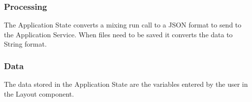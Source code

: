 \subsubsection*{Processing}
The Application State converts a mixing run call to a JSON format to send to the Application Service. When files need to be saved it converts the data to String format.

\subsubsection*{Data}
The data stored in the Application State are the variables entered by the user in the Layout component.
